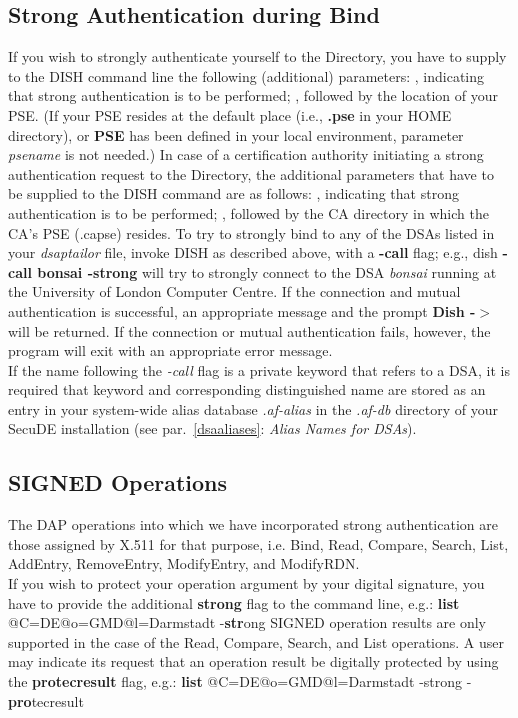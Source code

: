 \subsection{Strong Authentication during Bind}
If you wish to strongly authenticate yourself to the Directory, you have to supply
to the DISH command line the following (additional) parameters:
\bi
{}, indicating that strong authentication is to be performed;
, followed by the location of your PSE. (If your PSE resides
at the default place (i.e., {\bf .pse} in your HOME directory), or {\bf PSE} has been 
defined in your local environment, parameter {\em psename} is not needed.)
\ei
In case of a certification authority initiating a strong authentication request
to the Directory, the additional parameters that have to be supplied to the DISH
command are as follows:
\bi
{}, indicating that strong authentication is to be performed;
, followed by the CA directory in which the CA's PSE (.capse) resides.
\ei
To try to strongly bind to any of the DSAs listed in your {\em dsaptailor} file, invoke DISH as
described above, with a {\bf -call} flag; e.g., dish {\bf -call bonsai -strong} will try
to strongly connect to the DSA {\em bonsai} running at the University of London
Computer Centre. If the connection and mutual authentication is successful, an appropriate message
and the prompt {\bf Dish -$>$} will be returned. If the connection or mutual
authentication fails, however, the program will exit with an appropriate error message.
\\ [1em]
If the name following the {\em -call} flag is a private keyword that refers to a DSA, it is
required that keyword and corresponding distinguished name are stored as an entry in your
system-wide alias database {\em .af-alias} in the {\em .af-db} directory of your SecuDE
installation (see par.~\ref{dsaaliases}: {\em Alias Names for DSAs}).


\subsection{SIGNED Operations}
The DAP operations into which we have incorporated strong authentication are those
assigned by X.511 for that purpose, i.e. Bind, Read, Compare, Search, List, AddEntry, 
RemoveEntry, ModifyEntry, and ModifyRDN.
\\ [1em]
If you wish to protect your operation argument by your digital signature, you have
to provide the additional {\bf strong} flag to the command line, e.g.:
\bvtab
\1 {\bf list} @C=DE@o=GMD@l=Darmstadt -{\bf str}ong 
\evtab
SIGNED operation results are only supported in the case of the Read, Compare, Search, and List
operations.
A user may indicate its request that an operation result be digitally protected by using
the {\bf protecresult} flag, e.g.:
\bvtab
\1 {\bf list} @C=DE@o=GMD@l=Darmstadt -strong -{\bf pro}tecresult
\evtab


